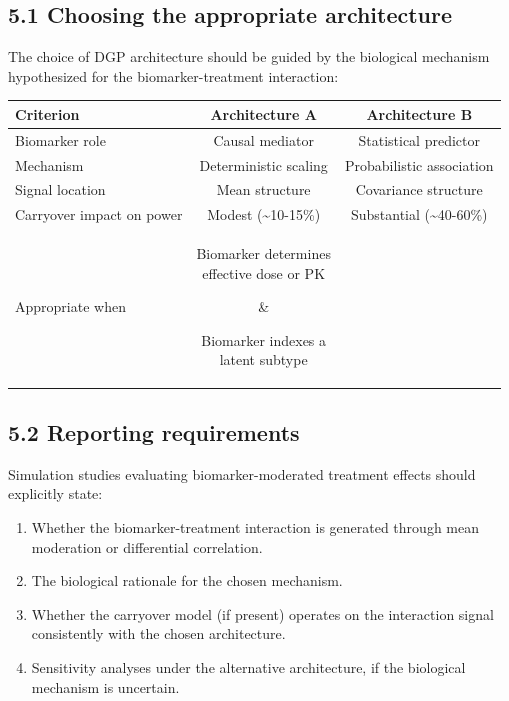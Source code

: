 \documentclass[11pt]{article}
\begin{document}
\subsection{5.1 Choosing the appropriate architecture}

The choice of DGP architecture should be guided by the biological
mechanism hypothesized for the biomarker-treatment interaction:

\begin{table}[htbp]
\centering
\begin{tabular}{lcc}
\toprule
Criterion & Architecture A & Architecture B \\
\midrule
Biomarker role & Causal mediator & Statistical predictor \\
Mechanism & Deterministic scaling & Probabilistic association \\
Signal location & Mean structure & Covariance structure \\
Carryover impact on power & Modest (\textasciitilde{}10-15\%) & Substantial (\textasciitilde{}40-60\%) \\
Appropriate when & \parbox[t]{3.5cm}{Biomarker determines\\effective dose or PK} & \parbox[t]{3.5cm}{Biomarker indexes a\\latent subtype} \\
\bottomrule
\end{tabular}
\end{table}

\subsection{5.2 Reporting requirements}

Simulation studies evaluating biomarker-moderated treatment effects
should explicitly state:

\begin{enumerate}
\item Whether the biomarker-treatment interaction is generated through
  mean moderation or differential correlation.
\item The biological rationale for the chosen mechanism.
\item Whether the carryover model (if present) operates on the
  interaction signal consistently with the chosen architecture.
\item Sensitivity analyses under the alternative architecture, if the
  biological mechanism is uncertain.
\end{enumerate}
\end{document}
